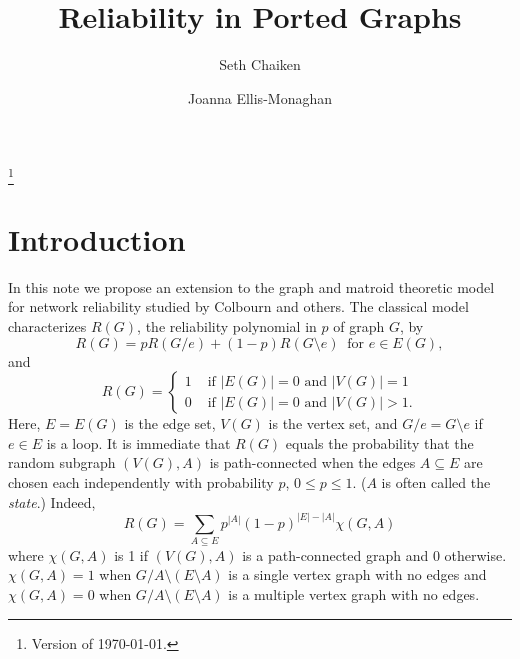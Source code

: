 \documentclass[12pt,leqno]{amsart}
\theoremstyle{remark}
\begin{document}
\title[Reliability in Ported Graphs]
{Reliability in Ported Graphs}

\author{Seth Chaiken}
\address{Computer Science Department\\
The University at Albany (SUNY)\\
Albany, NY 12222}

\author{Joanna Ellis-Monaghan}
\address{Department of Mathematics\\
St. Michaels College\\
Colchester, VT 05439}


\begin{abstract}
\end{abstract}





\thanks{Version of \today.}

\maketitle
\pagestyle{headings}


\section{Introduction}

In this note we propose an extension to the graph and matroid theoretic
model for network reliability studied by Colbourn and others.
The classical model characterizes 
$R(G)$, the reliability polynomial in $p$ of graph $G$, by
\begin{equation}
\label{pAdditiveTutteEq}
R(G)=pR(G/e)+(1-p)R(G\setminus e)\;\;\text{for }e\in E(G),
\end{equation}
and
\begin{equation}
\label{unportedReliabilityIVs}
R(G)=\left\{
 \begin{array}{ll}
  1 & \text{ if } |E(G)|=0 \text{ and } |V(G)|=1    \\
  0 & \text{ if } |E(G)|=0 \text{ and } |V(G)|> 1. 
 \end{array}
\right.
\end{equation}
Here, $E=E(G)$ is the edge set, 
$V(G)$ is the vertex set,
and $G/e = G\setminus e$ if $e\in E$ is a loop.
It is immediate that $R(G)$ equals the probability that the
random subgraph $(V(G),A)$ is path-connected 
when the edges $A\subseteq E$ are chosen
each independently with probability $p$, $0\le p \le 1$.
($A$ is often called the \emph{state}.) Indeed,
\begin{equation}
\label{unportedSetExpansion}
R(G)=\sum_{A\subseteq E}p^{|A|}(1-p)^{|E|-|A|}\chi(G,A)
\end{equation}
where $\chi(G,A)$ is 1 if $(V(G),A)$ is a path-connected graph and 
$0$ otherwise.  $\chi(G,A)=1$ when 
$G/A\setminus (E\setminus A)$ is a single vertex graph
with no edges and 
$\chi(G,A)=0$ when 
$G/A\setminus (E\setminus A)$ is a multiple vertex graph
with no edges.
\end{document}
